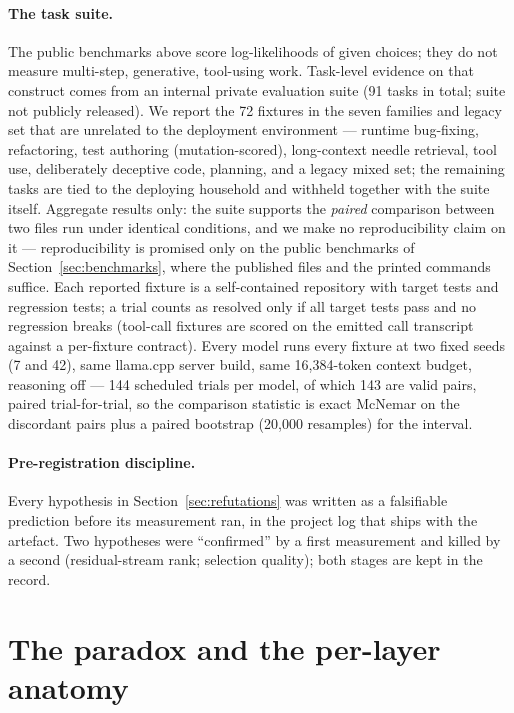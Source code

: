 \documentclass[10pt]{article} %
\begin{document}
\paragraph{The task suite.} The public benchmarks above score log-likelihoods
of given choices; they do not measure multi-step, generative, tool-using work.
Task-level evidence on that construct comes from an internal private
evaluation suite (91
tasks in total; suite not publicly released). We report the 72 fixtures in the
seven families and legacy set that are unrelated to the deployment
environment --- runtime bug-fixing, refactoring, test authoring
(mutation-scored), long-context needle retrieval, tool use, deliberately
deceptive code, planning, and a legacy mixed set; the remaining tasks are
tied to the deploying household and withheld together with the suite itself.
Aggregate results only: the suite supports the \emph{paired} comparison
between two files run under identical conditions, and we make no
reproducibility claim on it --- reproducibility is promised only on the
public benchmarks of Section~\ref{sec:benchmarks}, where the published files
and the printed commands suffice. Each reported fixture is a
self-contained repository with target tests and regression tests; a trial
counts as resolved only if all target tests pass and no regression breaks
(tool-call fixtures are scored on the emitted call transcript against a
per-fixture contract). Every model runs every fixture at two fixed seeds (7
and 42), same llama.cpp server build, same 16{,}384-token context budget,
reasoning off --- 144 scheduled trials per model, of which 143 are valid
pairs, paired trial-for-trial, so
the comparison statistic is exact McNemar on the discordant pairs plus a
paired bootstrap (20{,}000 resamples) for the interval.

\paragraph{Pre-registration discipline.} Every hypothesis in Section~\ref{sec:refutations} was written as
a falsifiable prediction before its measurement ran, in the project log that
ships with the artefact. Two hypotheses were ``confirmed'' by a first
measurement and killed by a second (residual-stream rank; selection quality);
both stages are kept in the record.

\section{The paradox and the per-layer anatomy}
\label{sec:paradox}
\end{document}

